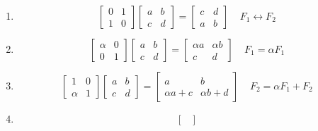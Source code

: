 \documentclass{article}
\begin{document}
\begin{enumerate}
    \item \begin{equation*}\begin{bmatrix}
        0 & 1 \\
        1 & 0
    \end{bmatrix}
    \begin{bmatrix}
        a & b \\
        c & d
    \end{bmatrix}
    =
    \begin{bmatrix}
        c & d \\
        a & b
    \end{bmatrix}
    \;\;\;\;F_1 \leftrightarrow F_2
\end{equation*}
    \item \begin{equation*}\begin{bmatrix}
        \alpha  & 0 \\
        0 & 1
    \end{bmatrix}
    \begin{bmatrix}
        a & b \\
        c & d
    \end{bmatrix}
    =
    \begin{bmatrix}
        \alpha a & \alpha b \\
        c & d
    \end{bmatrix}
    \;\;\;\;F_1 = \alpha F_1
\end{equation*}
    \item \begin{equation*}\begin{bmatrix}
        1  & 0 \\
        \alpha & 1
    \end{bmatrix}
    \begin{bmatrix}
        a & b \\
        c & d
    \end{bmatrix}
    =
    \begin{bmatrix}
        a & b \\
        \alpha a + c & \alpha b + d
    \end{bmatrix}
    \;\;\;\;F_2 = \alpha F_1 + F_2
\end{equation*}
    \item \begin{equation*}    
    \begin{bmatrix}

\end{bmatrix}
\end{equation*}
\end{enumerate}
\end{document}
